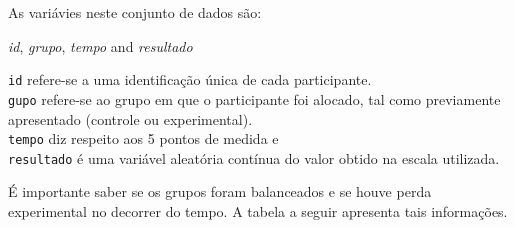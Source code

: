 \documentclass[
]{book}
\newenvironment{Shaded}{\begin{snugshade}}{\end{snugshade}}
\newcommand{\KeywordTok}[1]{\textcolor[rgb]{0.13,0.29,0.53}{\textbf{#1}}}
\newcommand{\NormalTok}[1]{#1}
\newcommand{\OperatorTok}[1]{\textcolor[rgb]{0.81,0.36,0.00}{\textbf{#1}}}
\newcommand{\StringTok}[1]{\textcolor[rgb]{0.31,0.60,0.02}{#1}}
\begin{document}
As variávies neste conjunto de dados são:

\begin{Shaded}
\end{Shaded}

\emph{id}, \emph{grupo}, \emph{tempo} and \emph{resultado}

\texttt{id} refere-se a uma identificação única de cada participante.\\
\texttt{gupo} refere-se ao grupo em que o participante foi alocado, tal
como previamente apresentado (controle ou experimental).\\
\texttt{tempo} diz respeito aos 5 pontos de medida e\\
\texttt{resultado} é uma variável aleatória contínua do valor obtido na
escala utilizada.

É importante saber se os grupos foram balanceados e se houve perda
experimental no decorrer do tempo. A tabela a seguir apresenta tais
informações.

\begin{Shaded}
\end{Shaded}
\end{document}
